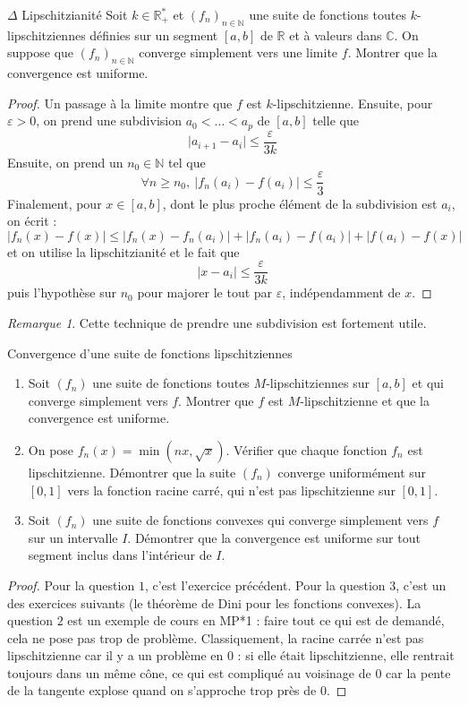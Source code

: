 \documentclass[french,a4paper]{article}
\newcommand{\N}{\mathbb{N}}
\newcommand{\R}{\mathbb{R}}
\newcommand{\C}{\mathbb{C}}
\newcommand{\st}{^*}
\theoremstyle{plain}
\theoremstyle{definition}
\theoremstyle{remark}
\newtheorem*{rmq}{Remarque}
\begin{document}
\begin{ex}{$\Delta$ Lipschitzianité}
	Soit $k\in\R_+\st$ et $(f_n)_{n\in\N}$ une suite de fonctions toutes $k$-lipschitziennes définies sur un segment $[a,b]$ de $\R$ et à valeurs dans $\C$. On suppose que $(f_n)_{n\in\N}$ converge simplement vers une limite $f$. Montrer que la convergence est uniforme.
\end{ex}
\begin{proof}
	Un passage à la limite montre que $f$ est $k$-lipschitzienne. Ensuite, pour $\varepsilon>0$, on prend une subdivision $a_0<\ldots<a_p$ de $[a,b]$ telle que $$\lvert a_{i+1}-a_i\rvert\leqslant\frac{\varepsilon}{3k}$$ Ensuite, on prend un $n_0\in\N$ tel que $$\forall n\geqslant n_0,\ \lvert f_n(a_i)-f(a_i)\rvert\leqslant\frac{\varepsilon}{3}$$ Finalement, pour $x\in[a,b]$, dont le plus proche élément de la subdivision est $a_i$, on écrit : $$\lvert f_n(x)-f(x)\rvert\leqslant\lvert f_n(x)-f_n(a_i)\rvert+\lvert f_n(a_i)-f(a_i)\rvert+\lvert f(a_i)-f(x)\rvert$$ et on utilise la lipschitzianité et le fait que $$\lvert x-a_i\rvert\leqslant \frac{\varepsilon}{3k}$$ puis l'hypothèse sur $n_0$ pour majorer le tout par $\varepsilon$, indépendamment de $x$.
\end{proof}
\begin{rmq}
	Cette technique de prendre une subdivision est fortement utile.
\end{rmq}

\begin{ex}[Châteaux]{Convergence d'une suite de fonctions lipschitziennes}
	\begin{enumerate}
		\item Soit $(f_n)$ une suite de fonctions toutes $M$-lipschitziennes sur $[a,b]$ et qui converge simplement vers $f$. Montrer que $f$ est $M$-lipschitzienne et que la convergence est uniforme.
		\item On pose $f_n(x)=\min(nx,\sqrt{x})$. Vérifier que chaque fonction $f_n$ est lipschitzienne. Démontrer que la suite $(f_n)$ converge uniformément sur $[0,1]$ vers la fonction racine carré, qui n'est pas lipschitzienne sur $[0,1]$.
		\item Soit $(f_n)$ une suite de fonctions convexes qui converge simplement vers $f$ sur un intervalle $I$. Démontrer que la convergence est uniforme sur tout segment inclus dans l'intérieur de $I$. 
	\end{enumerate}
\end{ex}
\begin{proof}
	Pour la question $1$, c'est l'exercice précédent. Pour la question $3$, c'est un des exercices suivants (le théorème de Dini pour les fonctions convexes). La question $2$ est un exemple de cours en MP*1 : faire tout ce qui est de demandé, cela ne pose pas trop de problème. Classiquement, la racine carrée n'est pas lipschitzienne car il y a un problème en $0$ : si elle était lipschitzienne, elle rentrait toujours dans un même cône, ce qui est compliqué au voisinage de $0$ car la pente de la tangente explose quand on s'approche trop près de $0$.
\end{proof}
\end{document}
